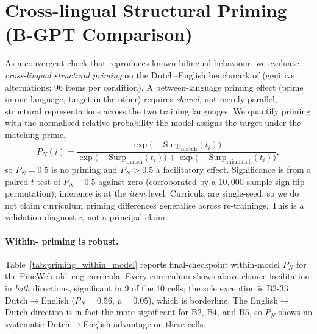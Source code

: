 \section{Cross-lingual Structural Priming (B-GPT Comparison)}\label{sec:priming}
 
As a convergent check that \beetle{} reproduces known bilingual behaviour, we evaluate \emph{cross-lingual structural priming} on the Dutch--English benchmark of \citet{bernolet2013language} (genitive alternations; $96$ items per condition). A between-language priming effect (prime in one language, target in the other) requires \emph{shared}, not merely parallel, structural representations across the two training languages. We quantify priming with the normalised relative probability the model assigns the target under the matching prime,
\[
  P_N(i) = \frac{\exp\!\big({-}\mathrm{Surp}_{\text{match}}(t_i)\big)}
                {\exp\!\big({-}\mathrm{Surp}_{\text{match}}(t_i)\big) + \exp\!\big({-}\mathrm{Surp}_{\text{mismatch}}(t_i)\big)},
\]
so $P_N=0.5$ is no priming and $P_N>0.5$ a facilitatory effect. Significance is from a paired $t$-test of $P_N-0.5$ against zero (corroborated by a $10{,}000$-sample sign-flip permutation); inference is at the \emph{item} level. Curricula are single-seed, so we do not claim curriculum priming differences generalise across re-trainings. This is a validation diagnostic, not a principal claim.
 
\paragraph{Within-\beetle{} priming is robust.} Table~\ref{tab:priming_within_model} reports final-checkpoint within-model $P_N$ for the FineWeb nld--eng curricula. Every curriculum shows above-chance facilitation in \emph{both} directions, significant in $9$ of the $10$ cells; the sole exception is B3-33 Dutch$\to$English ($P_N=0.56$, $p=0.05$), which is borderline. The English$\to$Dutch direction is in fact the more significant for B2, B4, and B5, so $P_N$ shows no systematic Dutch$\to$English advantage on these cells.
 
